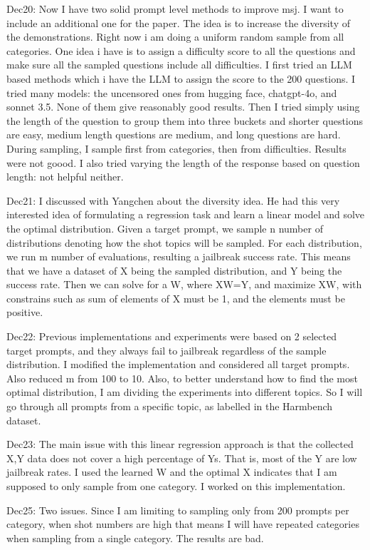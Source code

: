 Dec20: Now I have two solid prompt level methods to improve msj. I want to include an additional one for the paper. The idea is to increase the diversity of the demonstrations. Right now i am doing a uniform random sample from all categories. One idea i have is to assign a difficulty score to all the questions and make sure all the sampled questions include all difficulties. I first tried an LLM based methods which i have the LLM to assign the score to the 200 questions. I tried many models: the uncensored ones from hugging face, chatgpt-4o, and sonnet 3.5. None of them give reasonably good results. Then I tried simply using the length of the question to group them into three buckets and shorter questions are easy, medium length questions are medium, and long questions are hard. During sampling, I sample first from categories, then from difficulties. Results were not goood. I also tried varying the length of the response based on question length: not helpful neither.

Dec21: I discussed with Yangchen about the diversity idea. He had this very interested idea of formulating a regression task and learn a linear model and solve the optimal distribution. Given a target prompt, we sample n number of distributions denoting how the shot topics will be sampled. For each distribution, we run m number of evaluations, resulting a jailbreak success rate. This means that we have a dataset of X being the sampled distribution, and Y being the success rate. Then we can solve for a W, where XW=Y, and maximize XW, with constrains such as sum of elements of X must be 1, and the elements must be positive.

Dec22: Previous implementations and experiments were based on 2 selected target prompts, and they always fail to jailbreak regardless of the sample distribution. I modified the implementation and considered all target prompts. Also reduced m from 100 to 10. Also, to better understand how to find the most optimal distribution, I am dividing the experiments into different topics. So I will go through all prompts from a specific topic, as labelled in the Harmbench dataset.

Dec23: The main issue with this linear regression approach is that the collected X,Y data does not cover a high percentage of Ys. That is, most of the Y are low jailbreak rates. I used the learned W and the optimal X indicates that I am supposed to only sample from one category. I worked on this implementation.

Dec25: Two issues. Since I am limiting to sampling only from 200 prompts per category, when shot numbers are high that means I will have repeated categories when sampling from a single category. The results are bad.

